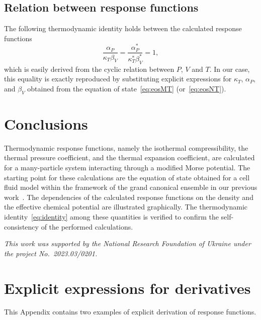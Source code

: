 \documentclass[fleqn,twoside,twocolumn,nofootinbib,showkeys]{revtex4} %
\begin{document}
	\subsection{Relation between response functions}
	The following thermodynamic identity holds between the calculated response functions
	\begin{equation}
		\label{eq:identity}
		\frac{\alpha_P}{\kappa_T \beta_V} = \frac{\alpha^*_P}{\kappa^*_T \beta^*_V} = 1,
	\end{equation}
	which is easily derived from the cyclic relation between $P$, $V$ and $T$. In our case, this equality is exactly reproduced by substituting explicit expressions for $\kappa_T$, $\alpha_P$, and $\beta_V$ obtained from the equation of state~\eqref{eq:eosMT} (or~\eqref{eq:eosNT}). 
	
	
	\section{Conclusions}
	Thermodynamic response functions, namely the isothermal compressibility, the thermal pressure coefficient, and the thermal expansion coefficient, are calculated for a many-particle system interacting through a modified Morse potential. The starting point for these calculations are the equation of state obtained for a cell fluid model within the framework of the grand canonical ensemble in our previous work~\cite{KozlovskiiDobush2020}. The dependencies of the calculated response functions on the density and the effective chemical potential are illustrated graphically. The thermodynamic identity~\eqref{eq:identity} among these quantities is verified to confirm the self-consistency of the performed calculations.
	
	\vskip3mm \textit{This work was supported by the National Research Foundation of Ukraine under the project No.~2023.03/0201.}
	
	\appendix
	\renewcommand{\theequation}{A.\arabic{equation}}
	\setcounter{equation}{0}
	
	\section{\label{sec:app-a} Explicit expressions for derivatives}
	This Appendix contains two examples of explicit derivation of response functions. 
	
\end{document}
